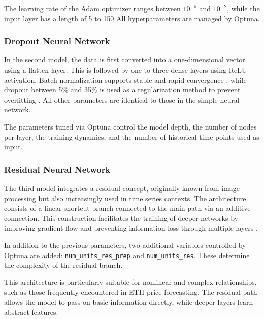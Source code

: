 The learning rate of the Adam optimizer ranges between $10^{-5}$ and $10^{-2}$, while the input layer has a length of 5 to 150
All hyperparameters are managed by Optuna.



\subsubsection{Dropout Neural Network}

In the second model, the data is first converted into a one-dimensional vector using a flatten layer.
This is followed by one to three dense layers using ReLU activation.
Batch normalization supports stable and rapid convergence \cite{batch-normalization}, while dropout between 5\% and 35\% is used as a regularization method to prevent overfitting \cite{keras-dropout}.
All other parameters are identical to those in the simple neural network.

The parameters tuned via Optuna control the model depth, the number of nodes per layer, the training dynamics, and the number of historical time points used as input.



\subsubsection{Residual Neural Network}

The third model integrates a residual concept, originally known from image processing but also increasingly used in time series contexts.
The architecture consists of a linear shortcut branch connected to the main path via an additive connection.
This construction facilitates the training of deeper networks by improving gradient flow and preventing information loss through multiple layers \cite{residual-nn}.

In addition to the previous parameters, two additional variables controlled by Optuna are added: \texttt{num\_units\_res\_prep} and \texttt{num\_units\_res}.
These determine the complexity of the residual branch.

This architecture is particularly suitable for nonlinear and complex relationships, such as those frequently encountered in ETH price forecasting.
The residual path allows the model to pass on basic information directly, while deeper layers learn abstract features.

